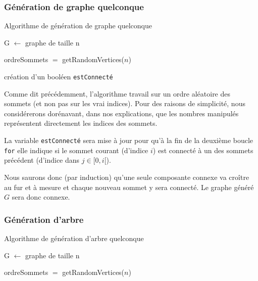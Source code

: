 \documentclass[a4paper,10pt]{article}
\begin{document}
\subsubsection{Génération de graphe quelconque}

\begin{algorithm}[H]
\caption{Algorithme de génération de graphe quelconque}
\BlankLine
G $\leftarrow$ graphe de taille n

ordreSommets $=$ getRandomVertices($n$)

création d'un booléen \texttt{estConnecté}



\end{algorithm}
\bigskip

Comme dit précédemment, l'algorithme travail sur un ordre aléatoire des sommets (et non pas sur les vrai indices). Pour des raisons de simplicité, nous considérerons dorénavant, dans nos explications, que les nombres manipulés représentent directement les indices des sommets.

La variable \texttt{estConnecté} sera mise à  jour pour qu'à la fin de la deuxième boucle \texttt{for} elle indique si le sommet courant (d'indice $i$) est connecté à un des sommets précédent (d'indice dans $j\in[0, i[$).

Nous saurons donc (par induction) qu'une seule composante connexe va croître au fur et à mesure et chaque nouveau sommet y sera connecté. Le graphe généré $G$ sera donc connexe.

\subsubsection{Génération d'arbre}

\begin{algorithm}[H]
\caption{Algorithme de génération d'arbre quelconque}
\BlankLine
G $\leftarrow$ graphe de taille n

ordreSommets $=$ getRandomVertices($n$)



\end{algorithm}
\bigskip
\end{document}
